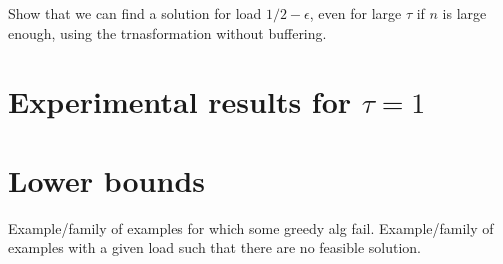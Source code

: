 \documentclass[10pt, conference, letterpaper]{IEEEtran}
\begin{document}
Show that we can find a solution for load $1/2 - \epsilon$, even for large 
$\tau$ if $n$ is large enough, using the trnasformation without buffering.

\section{Experimental results for $\tau = 1$}


\section{Lower bounds}

Example/family of examples for which some greedy alg fail.
Example/family of examples with a given load such that there are no feasible solution.


 
\end{document}
